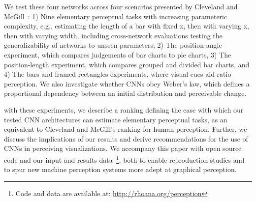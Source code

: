 We test these four networks across four scenarios presented by Cleveland and McGill~\cite{cleveland_mcgill}: 1) Nine elementary perceptual tasks with increasing parameteric complexity, e.g., estimating the length of a bar with fixed x, then with varying x, then with varying width, including cross-network evaluations testing the generalizability of networks to unseen parameters; 2) The position-angle experiment, which compares judgements of bar charts to pie charts, 3) The position-length experiment, which compares grouped and divided bar charts, and 4) The bars and framed rectangles experiments, where visual cues aid ratio perception. We also investigate whether CNNs obey Weber's law, which defines a proportional dependency between an initial distribution and perceivable change. 

with these experiments, we describe a ranking defining the ease with which our tested CNN architectures can estimate elementary perceptual tasks, as an equivalent to Cleveland and McGill's ranking for human perception. Further, we discuss the implications of our results and derive recommendations for the use of CNNs in perceiving visualizations. We accompany this paper with open source code and our input and results data~\footnote{Code and data are available at: \url{http://rhoana.org/perception}}, both to enable reproduction studies and to spur new machine perception systems more adept at graphical perception.




